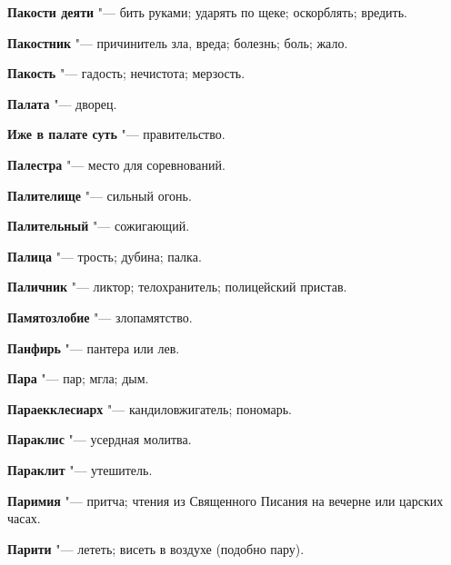 \begin{mymulticols}{2}
\noindent\textbf{Пакости деяти} "--- бить руками; ударять по щеке; оскорблять; вредить. 




\noindent\textbf{Пакостник} "--- причинитель зла, вреда; болезнь; боль; жало. 




\noindent\textbf{Пакость} "--- гадость; нечистота; мерзость. 




\noindent\textbf{Палата} "--- дворец. 




\noindent\textbf{Иже в палате суть} "--- правительство. 




\noindent\textbf{Палестра} "--- место для соревнований. 




\noindent\textbf{Палителище} "--- сильный огонь. 




\noindent\textbf{Палительный} "--- сожигающий. 




\noindent\textbf{Палица} "--- трость; дубина; палка. 




\noindent\textbf{Паличник} "--- ликтор; телохранитель; полицейский пристав. 




\noindent\textbf{Памятозлобие} "--- злопамятство. 




\noindent\textbf{Панфирь} "--- пантера или лев. 




\noindent\textbf{Пара} "--- пар; мгла; дым. 




\noindent\textbf{Параекклесиарх} "--- кандиловжигатель; пономарь. 




\noindent\textbf{Параклис} "--- усердная молитва. 




\noindent\textbf{Параклит} "--- утешитель. 




\noindent\textbf{Паримия} "--- притча; чтения из Священного Писания на вечерне или царских часах. 




\noindent\textbf{Парити} "--- лететь; висеть в воздухе (подобно пару). 





\end{mymulticols}
